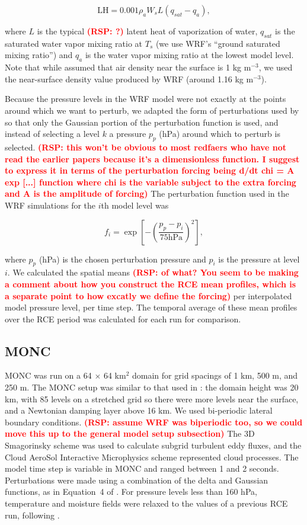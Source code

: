 \documentclass[draft]{agujournal2019}
\newcommand{\todo}[1]{\textcolor{red}{\textbf{(#1)}}}
\begin{document}
$$
\textrm{LH} = 0.001 \rho_a W_s L (q_{sat} - q_a),
$$

\noindent where $L$ is the typical \todo{RSP: ?} latent heat of vaporization of water,
$q_{sat}$ is the saturated water vapor mixing ratio at $T_s$ (we use WRF's
``ground saturated mixing ratio'') and $q_a$ is the water vapor mixing ratio at
the lowest model level. Note that while  assumed that air
density near the surface is 1 kg m$^{-3}$, we used the near-surface density
value produced by WRF (around 1.16 kg m$^{-3}$).

Because the pressure levels in the WRF model were not exactly at the points
around which we want to perturb, we adapted the form of perturbations used by
 so that only the Gaussian portion of the perturbation
function is used, and instead of selecting a level $k$ a pressure $p_p$ (hPa)
around which to perturb is selected. \todo{RSP: this won't be obvious to most redfaers who have not read the earlier papers because it's a dimensionless function. I suggest to express it in terms of the perturbation forcing being d/dt chi = A exp [...] function where chi is the variable subject to the extra forcing and A is the amplitude of forcing}  The perturbation function used in the WRF
simulations for the $i$th model level was

$$
f_i = \exp\left[ - \left( \frac{p_p - p_i}{75 \textrm{hPa}}\right)^2 \right],
$$

\noindent where $p_p$ (hPa) is the chosen perturbation pressure and $p_i$ is the
pressure at level $i$. We calculated the spatial means \todo{RSP: of what? You seem to be making a comment about how you construct the RCE mean profiles, which is a separate point to how excatly we define the forcing} per interpolated model
pressure level, per time step. The temporal average of these mean profiles over
the RCE period was calculated for each run for comparison.

\subsection{MONC}

MONC was run on a 64 $\times$ 64 km$^2$ domain for grid spacings of 1 km, 500 m,
and 250 m. The MONC setup was similar to that used in :
the domain height was 20 km, with 85 levels on a stretched grid so there were
more levels near the surface, and a Newtonian damping layer above 16 km. We used
bi-periodic lateral boundary conditions. \todo{RSP: assume WRF was biperiodic too, so we could move this up to the general model setup subsection}  The 3D Smagorinsky scheme \cite{Smag63,Lilly67} was used to
calculate subgrid turbulent eddy fluxes, and the Cloud AeroSol Interactive
Microphysics \cite<CASIM, see>{field23} scheme represented cloud processes. The
model time step is variable in MONC and ranged between 1 and 2 seconds.
Perturbations were made using a combination of the delta and Gaussian functions,
as in Equation~4 of . For pressure levels less than 160
hPa, temperature and moisture fields were relaxed to the values of a previous
RCE run, following \cite{Herman_JAMES_2013}.
\end{document}
